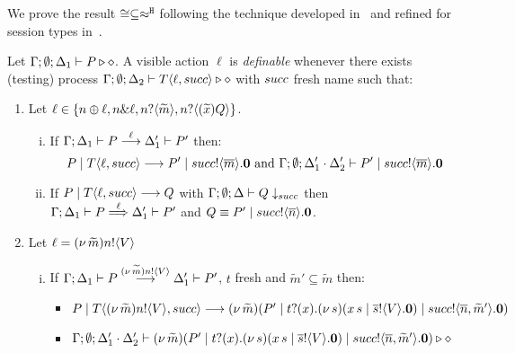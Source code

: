 We prove the result $\cong \subseteq \approx^\mathtt{H}$ following
the technique developed in~\cite{Hennessy07} and
refined for session types in~\cite{KYHH2015,KY2015}.


\begin{definition}[Definibility]\myrm
	\label{app:def:definibility}
	Let $\Gamma; \emptyset; \Delta_1 \vdash P \triangleright \diamond$.
	A visible action $\ell$ is \emph{definable} whenever
	there exists (testing) process
	$\Gamma; \emptyset; \Delta_2 \vdash T\langle \ell, succ \rangle \triangleright \diamond$
	with $succ$ fresh name %
	such that:
%
	\begin{enumerate}
		\item	Let $\ell \in \{n \oplus \ell, n \& \ell, n ? \langle \widetilde{m} \rangle, n ? \langle (\widetilde{x}) Q \rangle\}$.
		
			\begin{enumerate}[i.]
				\item	If $\Gamma; \Delta_1 \vdash P \stackrel{\ell}{\longrightarrow} \Delta_1' \vdash P'$
						then:
						\[
							P \;|\; T\langle \ell, succ \rangle \longrightarrow P' \;|\; succ ! \langle \overline{m} \rangle . \mathbf{0} \textrm{ and }
							\Gamma; \emptyset; \Delta_1' \cdot \Delta_2' \vdash P' \;|\; succ ! \langle \overline{m} \rangle . \mathbf{0}
						\]

				\item
						If $P \;|\; T\langle \ell, succ \rangle \longrightarrow Q$ with			
						$\Gamma; \emptyset; \Delta \vdash Q \downarrow_{succ}$ then \\
						$\Gamma; \Delta_1 \vdash P \stackrel{\ell}{\Longrightarrow} \Delta_1' \vdash P'$
						and $Q \equiv P' \;|\; succ ! \langle \overline{n} \rangle . \mathbf{0}$.
			\end{enumerate}
%
 		\item Let	$\ell = (\nu\, \widetilde{m})n ! \langle V \rangle$

			\begin{enumerate}[i.]
				\item	If $\Gamma; \Delta_1 \vdash P \stackrel{(\nu\, \widetilde{m})n ! \langle V \rangle}{\longrightarrow} \Delta_1' \vdash P'$,
						$t$ fresh
						and $\widetilde{m}' \subseteq \widetilde{m}$
						then:
%
						\begin{itemize}
							\item $P \;|\; T\langle (\nu\, \widetilde{m})n ! \langle V \rangle, succ \rangle \longrightarrow
							(\nu\, \widetilde{m})(P' \;|\; t ? (x) . (\nu\, s)(x\, {s} \;|\; \overline{s} ! \langle V \rangle . \mathbf{0}) \;|\; succ ! \langle \overline{n}, \widetilde{m}' \rangle . \mathbf{0})$
							\item $\Gamma; \emptyset; \Delta_1' \cdot \Delta_2' \vdash
							(\nu\, \widetilde{m})(P' \;|\; t ? (x) . (\nu\, s)(x\, {s} \;|\; \overline{s} ! \langle V \rangle . \mathbf{0}) \;|\;  succ ! \langle \overline{n}, \widetilde{m}' \rangle . \mathbf{0}) \triangleright \diamond$
						\end{itemize}


\end{enumerate}
\end{enumerate}
\end{definition}
